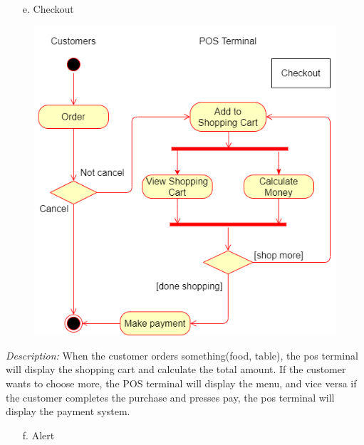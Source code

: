 \documentclass[11pt]{article}
\begin{document}
            \cleardoublepage
        \begin{enumerate}
            \item[e. ] Checkout
        \end{enumerate}
            \begin{figure}[!h]
                \centering
                \includegraphics[scale=0.45]{Activity diagram/Checkout.png}
            \end{figure}
            \textit{Description: }When the customer orders something(food, table), the pos terminal will display the shopping cart and calculate the total amount. If the customer wants to choose more, the POS terminal will display the menu, and vice versa if the customer completes the purchase and presses pay, the pos terminal will display the payment system.
        \begin{enumerate}
            \item[f. ] Alert
        \end{enumerate}    
\end{document}
